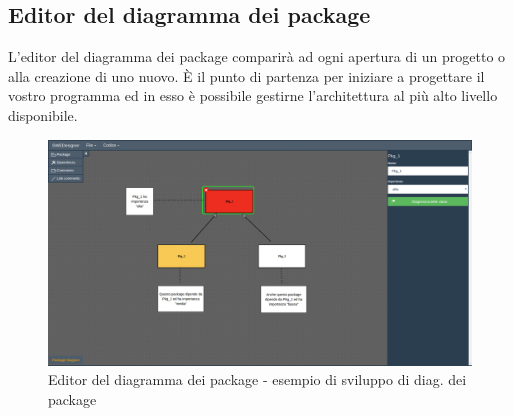 \documentclass[../ManualeUtente.tex]{subfiles}
\begin{document}
		\subsection{Editor del diagramma dei package}
			L'editor del diagramma dei package comparirà ad ogni apertura di un progetto o alla creazione di uno nuovo.
			È il punto di partenza per iniziare a progettare il vostro programma ed in esso è possibile gestirne
			l'architettura al più alto livello disponibile.
			\begin{figure} [h!]
				\centering
				\includegraphics[scale=0.24]{./Immagini/PackageDiagram.png}
				\caption{Editor del diagramma dei package - esempio di sviluppo di diag. dei package}\label{fig:PackageDiagram}
			\end{figure}
\end{document}
